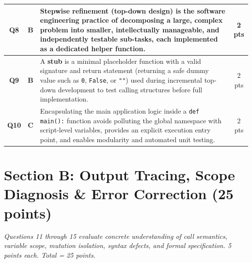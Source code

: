 \documentclass[11pt,a4paper]{article}
\begin{document}
\begin{center}
\begin{tabularx}{\textwidth}{|c|c|X|c|}
\hline
\textbf{Q8} & \textbf{B} & \textbf{Stepwise refinement} (top-down design) is the software engineering practice of decomposing a large, complex problem into smaller, intellectually manageable, and independently testable sub-tasks, each implemented as a dedicated helper function. & 2 pts \\
\hline
\textbf{Q9} & \textbf{B} & A \textbf{stub} is a minimal placeholder function with a valid signature and return statement (returning a safe dummy value such as \texttt{0}, \texttt{False}, or \texttt{""}) used during incremental top-down development to test calling structures before full implementation. & 2 pts \\
\hline
\textbf{Q10} & \textbf{C} & Encapsulating the main application logic inside a \texttt{def main():} function avoids polluting the global namespace with script-level variables, provides an explicit execution entry point, and enables modularity and automated unit testing. & 2 pts \\
\hline
\end{tabularx}
\end{center}

\vspace{0.3cm}

\section*{Section B: Output Tracing, Scope Diagnosis \& Error Correction (25 points)}
\textit{Questions 11 through 15 evaluate concrete understanding of call semantics, variable scope, mutation isolation, syntax defects, and formal specification. 5 points each. Total = 25 points.}

\newpage

\end{document}
